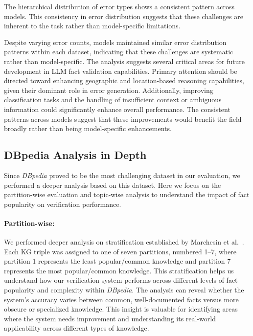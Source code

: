 The hierarchical distribution of error types shows a consistent pattern across models.
This consistency in error distribution suggests that these challenges are inherent to the task rather than model-specific limitations.

Despite varying error counts, models maintained similar error distribution patterns within each dataset, indicating that these challenges are systematic rather than model-specific.
The analysis suggests several critical areas for future development in LLM fact validation capabilities.
Primary attention should be directed toward enhancing geographic and location-based reasoning capabilities, given their dominant role in error generation.
Additionally, improving classification tasks and the handling of insufficient context or ambiguous information could significantly enhance overall performance.
The consistent patterns across models suggest that these improvements would benefit the field broadly rather than being model-specific enhancements.

\subsection{DBpedia Analysis in Depth}\label{subsec:db}
Since \textit{DBpedia} proved to be the most challenging dataset in our evaluation, we performed a deeper analysis based on this dataset.
Here we focus on the partition-wise evaluation and topic-wise analysis to understand the impact of fact popularity on verification performance.
\paragraph{Partition-wise:} We performed deeper analysis on stratification established by Marchesin et al.~\cite{Marchesin_Silvello_Alonso_2024}.
Each \ac{KG} triple was assigned to one of seven partitions, numbered 1--7, where partition 1 represents the least popular/common knowledge and partition 7 represents the most popular/common knowledge.
This stratification helps us understand how our verification system performs across different levels of fact popularity and complexity within \textit{DBpedia}.
The analysis can reveal whether the system's accuracy varies between common, well-documented facts versus more obscure or specialized knowledge.
This insight is valuable for identifying areas where the system needs improvement and understanding its real-world applicability across different types of knowledge.


